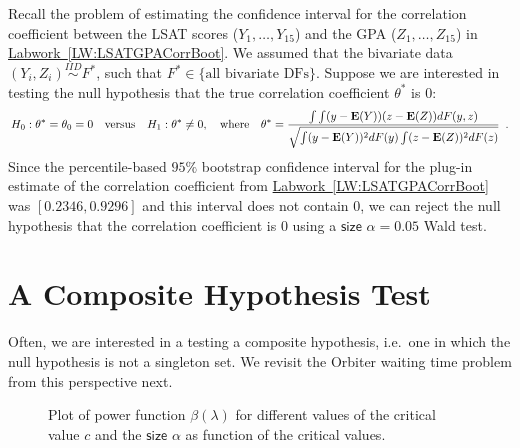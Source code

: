 \begin{example}
Recall the problem of estimating the confidence interval for the correlation coefficient between the LSAT scores ($Y_1,\ldots,Y_{15}$) and the GPA ($Z_1,\ldots,Z_{15}$) in \hyperref[LW:LSATGPACorrBoot]{Labwork~\ref*{LW:LSATGPACorrBoot}}.  We assumed that the bivariate data $(Y_i,Z_i) \overset{IID}{\sim} F^*$, such that $F^* \in \{ \text{all bivariate DFs} \}$. Suppose we are interested in testing the null hypothesis that the true correlation coefficient $\theta^*$ is $0$:
\[
H_0: \theta^* = \theta_0 = 0 \quad \text{versus} \quad H_1: \theta^* \neq 0, \quad \text{where} \quad  \theta^* = \frac{\int \int (y-\mathbf{E}(Y))(z-\mathbf{E}(Z))dF(y,z)}{\sqrt{\int (y-\mathbf{E}(Y))^2 dF(y) \int (z-\mathbf{E}(Z))^2 dF(z)}} \enspace .
\]
Since the percentile-based $95\%$ bootstrap confidence interval for the plug-in estimate of the correlation coefficient from \hyperref[LW:LSATGPACorrBoot]{Labwork~\ref*{LW:LSATGPACorrBoot}} was $[0.2346, 0.9296]$ and this interval does not contain $0$, we can reject the null hypothesis that the correlation coefficient is $0$ using a $\mathsf{size}$ $\alpha=0.05$ Wald test.
\end{example}

\section{A Composite Hypothesis Test}
Often, we are interested in a testing a composite hypothesis, i.e.~one in which  the null hypothesis is not a singleton set.  We revisit the Orbiter waiting time problem from this perspective next.
\begin{figure}[htpb]
\caption{Plot of power function $\beta(\lambda)$ for different values of the critical value $c$ and the $\mathsf{size}$ $\alpha$ as function of the critical values.
\label{F:ExponentialTestOrbiter}}
\centering   {}
\end{figure}

